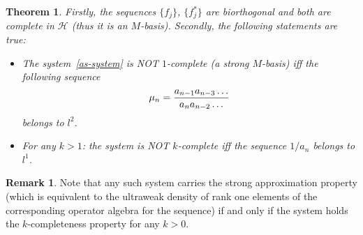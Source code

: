 \documentclass[12pt]{article}
\renewcommand{\cal}[1]{\mathcal{#1}}
\newtheorem{theorem}{Theorem}
\theoremstyle{definition}
\newtheorem{remark}{Remark}
\numberwithin{remark}{section}
\numberwithin{theorem}{section}
\numberwithin{prop}{section}
\numberwithin{equation}{section}
\numberwithin{lemma}{section}
\numberwithin{prop_under_lemma}{lemma}
\begin{document}
    \begin{theorem}
        \label{thm_as}
        Firstly, the sequences $\{f_j\}$, $\{f^*_j\}$ are biorthogonal and both are complete in $\cal{H}$ (thus it is an $M$-basis).
        Secondly, the following statements are true:
        \begin{itemize}
            \item  The system~\eqref{as-system} is NOT $1$-complete (a strong $M$-basis) iff the following sequence
                \begin{equation}
                    \mu_n = \frac{a_{n-1} a_{n-3} \dots}{a_{n} a_{n-2} \dots }\\
                \end{equation}
                belongs to $l^2$.
            \item For any $k>1$: the system is NOT $k$-complete iff the sequence $1/a_n$ belongs to $l^1$.
        \end{itemize}
    \end{theorem}
    \begin{remark}
       Note that any such system carries the strong approximation property (which is equivalent to the
       ultraweak density of rank one elements of the corresponding operator algebra for the sequence) 
       if and only if the system holds the $k$-completeness property for any $k>0$.
    \end{remark}
\end{document}
